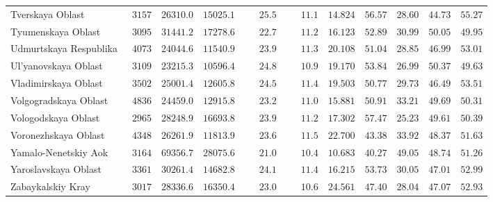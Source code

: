 {\begin{longtable}{lcccccccccc}
		Tverskaya Oblast  & $\phantom{0}3157$ & $26310.0$ & $15025.1$ & $\phantom{000}25.5$ & $\phantom{000}11.1$ & $14.824$ & $56.57$ & $28.60$ & $44.73$ & $55.27$ \\
		Tyumenskaya Oblast  & $\phantom{0}3095$ & $31441.2$ & $17278.6$ & $\phantom{000}22.7$ & $\phantom{000}11.2$ & $16.123$ & $52.89$ & $30.99$ & $50.05$ & $49.95$ \\
		Udmurtskaya Respublika  & $\phantom{0}4073$ & $24044.6$ & $11540.9$ & $\phantom{000}23.9$ & $\phantom{000}11.3$ & $20.108$ & $51.04$ & $28.85$ & $46.99$ & $53.01$ \\
		Ul'yanovskaya Oblast  & $\phantom{0}3109$ & $23215.3$ & $10596.4$ & $\phantom{000}24.8$ & $\phantom{000}10.9$ & $19.170$ & $53.84$ & $26.99$ & $50.37$ & $49.63$ \\
		Vladimirskaya Oblast  & $\phantom{0}3502$ & $25001.4$ & $12605.8$ & $\phantom{000}24.5$ & $\phantom{000}11.4$ & $19.503$ & $50.77$ & $29.73$ & $46.49$ & $53.51$ \\
		Volgogradskaya Oblast  & $\phantom{0}4836$ & $24459.0$ & $12915.8$ & $\phantom{000}23.2$ & $\phantom{000}11.0$ & $15.881$ & $50.91$ & $33.21$ & $49.69$ & $50.31$ \\
		Vologodskaya Oblast  & $\phantom{0}2965$ & $28248.9$ & $16693.8$ & $\phantom{000}23.9$ & $\phantom{000}11.2$ & $17.302$ & $57.47$ & $25.23$ & $49.61$ & $50.39$ \\
		Voronezhskaya Oblast  & $\phantom{0}4348$ & $26261.9$ & $11813.9$ & $\phantom{000}23.6$ & $\phantom{000}11.5$ & $22.700$ & $43.38$ & $33.92$ & $48.37$ & $51.63$ \\
		Yamalo-Nenetskiy Aok  & $\phantom{0}3164$ & $69356.7$ & $28075.6$ & $\phantom{000}21.0$ & $\phantom{000}10.4$ & $10.683$ & $40.27$ & $49.05$ & $48.74$ & $51.26$ \\
		Yaroslavskaya Oblast  & $\phantom{0}3361$ & $30261.4$ & $14682.8$ & $\phantom{000}24.1$ & $\phantom{000}11.4$ & $16.215$ & $53.73$ & $30.05$ & $47.01$ & $52.99$ \\
		Zabaykalskiy Kray  & $\phantom{0}3017$ & $28336.6$ & $16350.4$ & $\phantom{000}23.0$ & $\phantom{000}10.6$ & $24.561$ & $47.40$ & $28.04$ & $47.07$ & $52.93$ \\
		\hline 
	\end{longtable}
}
